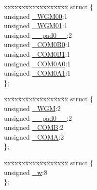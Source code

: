 \begin{DoxyCompactItemize}
\item 
\begin{tabbing}
xx\=xx\=xx\=xx\=xx\=xx\=xx\=xx\=xx\=\kill
struct \{\\
\>unsigned \hyperlink{union_____t_c_c_r0_abits__t_afdcfcd3db98778bccc47a0940853a1a6}{\_WGM00}:1\\
\>unsigned \hyperlink{union_____t_c_c_r0_abits__t_a92dde5e2a5280917d663ebd4730f73be}{\_WGM01}:1\\
\>unsigned \hyperlink{union_____t_c_c_r0_abits__t_afeb89056b30f7367265593efed652c0c}{\_\_pad0\_\_}:2\\
\>unsigned \hyperlink{union_____t_c_c_r0_abits__t_a71364693c2cfae1ff98fb26f7563d891}{\_COM0B0}:1\\
\>unsigned \hyperlink{union_____t_c_c_r0_abits__t_a03008a643fada314ca27366e5488f8cb}{\_COM0B1}:1\\
\>unsigned \hyperlink{union_____t_c_c_r0_abits__t_a3cfead9b848e04300829323d8645f6ee}{\_COM0A0}:1\\
\>unsigned \hyperlink{union_____t_c_c_r0_abits__t_a67d9619cf1cebd1454b21ebfb15f4b37}{\_COM0A1}:1\\
\}; \\

\end{tabbing}\item 
\begin{tabbing}
xx\=xx\=xx\=xx\=xx\=xx\=xx\=xx\=xx\=\kill
struct \{\\
\>unsigned \hyperlink{union_____t_c_c_r0_abits__t_ab73fd41ef1e6d8482c94d8a85efdaf86}{\_WGM}:2\\
\>unsigned \hyperlink{union_____t_c_c_r0_abits__t_afeb89056b30f7367265593efed652c0c}{\_\_pad0\_\_}:2\\
\>unsigned \hyperlink{union_____t_c_c_r0_abits__t_a290f9b48dbc9095cdc443830d0cc38f3}{\_COMB}:2\\
\>unsigned \hyperlink{union_____t_c_c_r0_abits__t_a10b1544a9467af76d882676763868565}{\_COMA}:2\\
\}; \\

\end{tabbing}\item 
\begin{tabbing}
xx\=xx\=xx\=xx\=xx\=xx\=xx\=xx\=xx\=\kill
struct \{\\
\>unsigned \hyperlink{union_____t_c_c_r0_abits__t_a0f01e47a94cde3b404ee5e5a42e99389}{\_w}:8\\
\}; \\

\end{tabbing}\end{DoxyCompactItemize}


